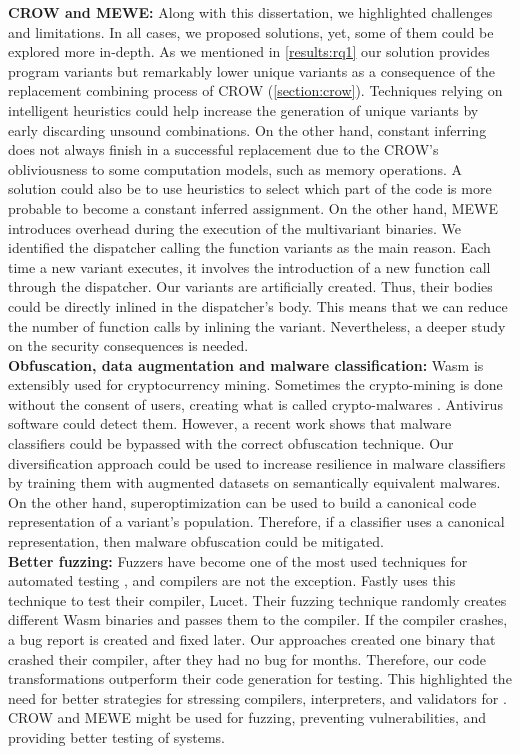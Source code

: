 \textbf{CROW and MEWE:} Along with this dissertation, we highlighted challenges and limitations. In all cases, we proposed solutions, yet, some of them could be explored more in-depth.
As we mentioned in \autoref{results:rq1} our solution provides program variants but remarkably lower unique variants as a consequence of the replacement combining process of CROW (\autoref{section:crow}). 
Techniques relying on intelligent heuristics could help increase the generation of unique variants by early discarding unsound combinations.
On the other hand, constant inferring does not always finish in a successful replacement due to the CROW's obliviousness to some computation models, such as memory operations. 
A solution could also be to use heuristics to select which part of the code is more probable to become a constant inferred assignment.
On the other hand, MEWE introduces overhead during the execution of the multivariant binaries.
We identified the dispatcher calling the function variants as the main reason.
Each time a new variant executes, it involves the introduction of a new function call through the dispatcher.
Our variants are artificially created. Thus, their bodies could be directly inlined in the dispatcher's body.
This means that we can reduce the number of function calls by inlining the variant.
Nevertheless, a deeper study on the security consequences is needed.
\\

\textbf{Obfuscation, data augmentation and malware classification:}
Wasm is extensibly used for cryptocurrency mining. 
Sometimes the crypto-mining is done without the consent of users, creating what is called crypto-malwares \cite{Hilbig2021AnES}.
Antivirus software could detect them. 
However, a recent work \cite{10.1145/3507657.3528560} shows that malware classifiers could be bypassed with the correct obfuscation technique.
Our diversification approach could be used to increase resilience in malware classifiers by training them with augmented datasets on semantically equivalent malwares.
On the other hand, superoptimization can be used to build a canonical code representation of a variant's population.
Therefore, if a classifier uses a canonical representation, then malware obfuscation could be mitigated.
\\

\textbf{Better fuzzing:}
Fuzzers have become one of the most used techniques for automated testing \cite{zalewski2017american}, and compilers are not the exception.
Fastly uses this technique to test their compiler, Lucet.
Their fuzzing technique randomly creates different Wasm binaries and passes them to the compiler. If the compiler crashes, a bug report is created and fixed later.
Our approaches created one binary that crashed their compiler\cite{CVE}, after they had no bug for months.
Therefore, our code transformations outperform their code generation for testing. 
This highlighted the need for better strategies for stressing compilers, interpreters, and validators for \wasm.
CROW and MEWE might be used for fuzzing, preventing vulnerabilities, and providing better testing of systems.


